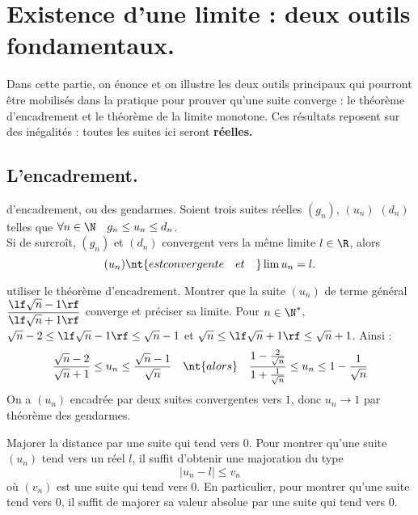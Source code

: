 \documentclass[11pt]{article}
\begin{document}
\section{Existence d'une limite : deux outils fondamentaux.}

Dans cette partie, on énonce et on illustre les deux outils principaux qui pourront être mobilisés dans la pratique pour prouver qu'une suite converge : le théorème d'encadrement et le théorème de la limite monotone. Ces résultats reposent sur des inégalités : toutes les suites ici seront \bf{réelles}.

\subsection{L'encadrement.}

\begin{thm}{d'encadrement, ou des gendarmes.}{}
    Soient trois suites réelles $(g_n)$, $(u_n)$ $(d_n)$ telles que $\forall n \in \N \quad g_n \leq u_n \leq d_n$.\\
    Si de surcroît, $(g_n)$ et $(d_n)$ convergent vers la même limite $l\in \R$, alors
    \begin{equation*}
        (u_n) \nt{ est convergente \quad et \quad} \lim u_n = l.
    \end{equation*}
\end{thm}

\begin{ex}{utiliser le théorème d'encadrement.}{}
    Montrer que la suite $(u_n)$ de terme général $\displaystyle\frac{\lf \sqrt{n} - 1 \rf}{\lf \sqrt{n} + 1 \rf}$ converge et préciser sa limite.
    \tcblower
    Pour $n\in\N^*$, $\sqrt{n}-2\leq\lf \sqrt{n} - 1 \rf \leq \sqrt{n}-1$ et $\sqrt{n}\leq \lf \sqrt{n} + 1 \rf \leq \sqrt{n} + 1$. Ainsi :
    \begin{equation*}
        \frac{\sqrt{n}-2}{\sqrt{n}+1} \leq u_n \leq \frac{\sqrt{n}-1}{\sqrt{n}} \quad\nt{alors}\quad \frac{1-\frac{2}{\sqrt{n}}}{1+\frac{1}{\sqrt{n}}}\leq u_n \leq 1-\frac{1}{\sqrt{n}}
    \end{equation*}
    On a $(u_n)$ encadrée par deux suites convergentes vers $1$, donc $u_n\to1$ par théorème des gendarmes.
\end{ex}

\begin{meth}{Majorer la distance par une suite qui tend vers 0.}{}
    Pour montrer qu'une suite $(u_n)$ tend vers un réel $l$, il suffit d'obtenir une majoration du type
    \begin{equation*}
        |u_n-l|\leq v_n
    \end{equation*}
    où $(v_n)$ est une suite qui tend vers 0.\n
    En particulier, pour montrer qu'une suite tend vers 0, il suffit de majorer sa valeur absolue par une suite qui tend vers 0.
\end{meth}
\end{document}
